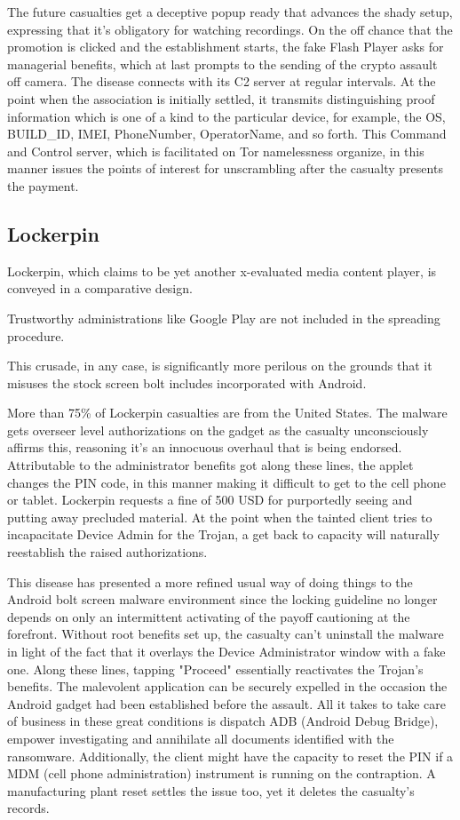 The future casualties get a deceptive popup ready that advances the shady setup, expressing that it's obligatory for watching recordings.
On the off chance that the promotion is clicked and the establishment starts, the fake Flash Player asks for managerial benefits, which at last prompts to the sending of the crypto assault off camera. 
The disease connects with its C2 server at regular intervals. At the point when the association is initially settled, it transmits distinguishing proof information which is one of a kind to the particular device, for example, the OS, BUILD\_ID, IMEI, PhoneNumber, OperatorName, and so forth. 
This Command and Control server, which is facilitated on Tor namelessness organize, in this manner issues the points of interest for unscrambling after the casualty presents the payment.

\subsection{Lockerpin}
Lockerpin, which claims to be yet another x-evaluated media content player, is conveyed in a comparative design. 

Trustworthy administrations like Google Play are not included in the spreading procedure. 

This crusade, in any case, is significantly more perilous on the grounds that it misuses the stock screen bolt includes incorporated with Android. 

More than 75\% of Lockerpin casualties are from the United States. The malware gets overseer level authorizations on the gadget as the casualty unconsciously affirms this, reasoning it's an innocuous overhaul that is being endorsed. Attributable to the administrator benefits got along these lines, the applet changes the PIN code, in this manner making it difficult to get to the cell phone or tablet. Lockerpin requests a fine of 500 USD for purportedly seeing and putting away precluded material. At the point when the tainted client tries to incapacitate Device Admin for the Trojan, a get back to capacity will naturally reestablish the raised authorizations. 

This disease has presented a more refined usual way of doing things to the Android bolt screen malware environment since the locking guideline no longer depends on only an intermittent activating of the payoff cautioning at the forefront. Without root benefits set up, the casualty can't uninstall the malware in light of the fact that it overlays the Device Administrator window with a fake one. Along these lines, tapping "Proceed" essentially reactivates the Trojan's benefits.
The malevolent application can be securely expelled in the occasion the Android gadget had been established before the assault. All it takes to take care of business in these great conditions is dispatch ADB (Android Debug Bridge), empower investigating and annihilate all documents identified with the ransomware. Additionally, the client might have the capacity to reset the PIN if a MDM (cell phone administration) instrument is running on the contraption. A manufacturing plant reset settles the issue too, yet it deletes the casualty's records. 

